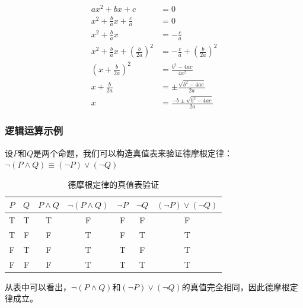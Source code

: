 \documentclass{article}
\begin{document}
\begin{align}
    ax^2 + bx + c                                    & = 0                                          \\
    x^2 + \frac{b}{a}x + \frac{c}{a}                 & = 0                                          \\
    x^2 + \frac{b}{a}x                               & = -\frac{c}{a}                               \\
    x^2 + \frac{b}{a}x + \left(\frac{b}{2a}\right)^2 & = -\frac{c}{a} + \left(\frac{b}{2a}\right)^2 \\
    \left(x + \frac{b}{2a}\right)^2                  & = \frac{b^2 - 4ac}{4a^2}                     \\
    x + \frac{b}{2a}                                 & = \pm\frac{\sqrt{b^2 - 4ac}}{2a}             \\
    x                                                & = \frac{-b \pm \sqrt{b^2 - 4ac}}{2a}
\end{align}

\subsubsection{逻辑运算示例}

设$P$和$Q$是两个命题，我们可以构造真值表来验证德摩根定律：$\neg(P \land Q) \equiv (\neg P) \lor (\neg Q)$

\begin{table}[h]
    \centering
    \begin{tabular}{|c|c|c|c|c|c|c|}
        \hline
        $P$ & $Q$ & $P \land Q$ & $\neg(P \land Q)$ & $\neg P$ & $\neg Q$ & $(\neg P) \lor (\neg Q)$ \\
        \hline
        T   & T   & T           & F                 & F        & F        & F                        \\
        T   & F   & F           & T                 & F        & T        & T                        \\
        F   & T   & F           & T                 & T        & F        & T                        \\
        F   & F   & F           & T                 & T        & T        & T                        \\
        \hline
    \end{tabular}
    \caption{德摩根定律的真值表验证}
\end{table}

从表中可以看出，$\neg(P \land Q)$和$(\neg P) \lor (\neg Q)$的真值完全相同，因此德摩根定律成立。
\end{document}

